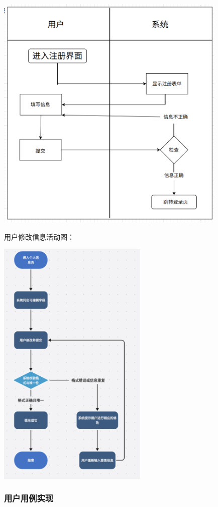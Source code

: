 \documentclass[]{article}
\begin{document}
\includegraphics[width=4.35278in,height=4.51458in]{media/media/image2.png}

用户修改信息活动图：

\includegraphics[width=2.82083in,height=4.73958in]{media/media/image3.png}

\hypertarget{ux7528ux6237ux7528ux4f8bux5b9eux73b0}{%
  \subsubsection{用户用例实现}\label{ux7528ux6237ux7528ux4f8bux5b9eux73b0}}
\end{document}
